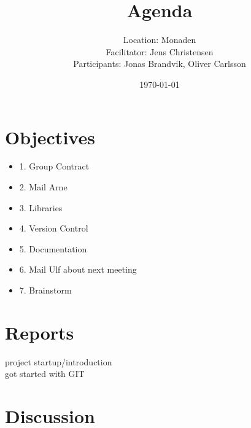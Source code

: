 \documentclass[11pt]{article}
\title{Agenda}
\author{Location: Monaden \\
  Facilitator: Jens Christensen \\
  Participants: Jonas Brandvik, Oliver Carlsson}
\date{\today}
\begin{document}
\maketitle

\section{Objectives}
\begin{itemize}
 
  \item 1. Group Contract
  \item 2. Mail Arne
  \item 3. Libraries 
  \item 4. Version Control
  \item 5. Documentation
  \item 6. Mail Ulf about next meeting
  \item 7. Brainstorm
 
\end{itemize}

\section{Reports}

project startup/introduction \\
got started with GIT

\section{Discussion}
\end{document}
